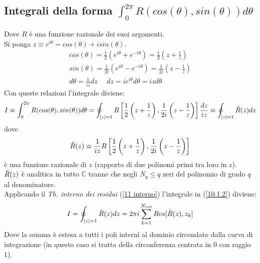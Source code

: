\documentclass[twoside]{article}
\begin{document}
\subsection{Integrali della forma \texorpdfstring{$\int_0 ^{2\pi}R(cos(\theta),sin(\theta))d\theta$}{Lg}}
Dove $R$ è una funzione razionale dei suoi argomenti.
\\
Si ponga $z\equiv e^{i\theta}=cos(\theta)+isin(\theta)$.
\begin{equation}
    \begin{split}
        cos(\theta)=\frac{1}{2}(e^{i\theta}+e^{-i\theta})=\frac{1}{2}\left(z+\frac{1}{z}\right) \\
        sin(\theta)=\frac{1}{2i}(e^{i\theta}-e^{-i\theta})=\frac{1}{2i}\left( z-\frac{1}{z}\right) \\
        d\theta = \frac{1}{iz}dz \ \ \ \ \ \ dz=ie^{i\theta}d\theta=izd\theta
    \end{split}
\end{equation}
Con queste relazioni l'integrale diviene:
\begin{equation} \label{10.1.2}
    I\equiv \int_0 ^{2\pi} R(cos(\theta),sin(\theta))d\theta=\oint_{|z|=1}R\left[ \frac{1}{2}\left( z+\frac{1}{z} \right),\frac{1}{2i}\left( z-\frac{1}{z} \right) \right]\frac{dz}{iz}\equiv \oint_{|z|=1}\Tilde{R}(z)dz
\end{equation}
dove 
\begin{equation}
    \Tilde{R}(z)\equiv \frac{1}{iz}R\left[ \frac{1}{2}\left( z+\frac{1}{z} \right),\frac{1}{2i}\left( z-\frac{1}{z} \right) \right]
\end{equation}
è una funzione razionale di $z$ (rapporto di due polinomi primi tra loro in $z$).
\\
$\Tilde{R}(z)$ è analitica in tutto $\mathds{C}$ tranne che negli $N_q\le q$ zeri del polinomio di grado $q$ al denominatore.
\\
Applicando il \textit{Th. interno dei residui} (\ref{11 interno}) l'integrale in (\ref{10.1.2}) diviene:
\begin{equation}
    I=\oint_{|z|=1}\Tilde{R}(z)dz=2\pi i \sum_{k=1}^{N_{int}}Res[\Tilde{R}(z),z_k]
\end{equation}
Dove la somma è estesa a tutti i poli interni al dominio circondato dalla curva di integrazione (in questo caso si tratta della circonferenza centrata in 0 con raggio 1).
\end{document}
